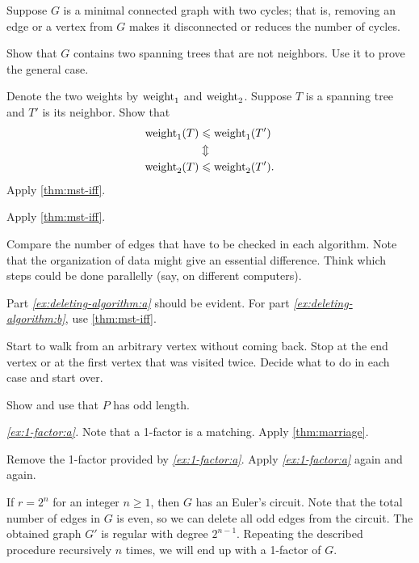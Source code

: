 Suppose $G$ is a minimal connected graph with two cycles;
that is, removing an edge or a vertex from $G$ makes it disconnected or reduces the number of cycles.

Show that $G$ contains two spanning trees that are not neighbors.
Use it to prove the general case.

 Denote the two weights by $\mathop{\rm weight}\nolimits_1$ and $\mathop{\rm weight}\nolimits_2$.
Suppose $T$ is a spanning tree and $T'$ is its neighbor. 
Show that 
\begin{align*}
\mathop{\rm weight}\nolimits_1(T)&\leqslant \mathop{\rm weight}\nolimits_1(T')
\\
&\Updownarrow
\\
\mathop{\rm weight}\nolimits_2(T)&\leqslant \mathop{\rm weight}\nolimits_2(T').
\end{align*}
Apply \ref{thm:mst-iff}.

 Apply \ref{thm:mst-iff}.

Compare the number of edges that have to be checked in each algorithm.
Note that the organization of data might give an essential difference.
Think which steps could be done parallelly (say, on different computers).


Part \textit{\ref{ex:deleting-algorithm:a}} should be evident.
For part \textit{\ref{ex:deleting-algorithm:b}}, use \ref{thm:mst-iff}.

Start to walk from an arbitrary vertex without coming back.
Stop at the end vertex or at the first vertex that was visited twice.
Decide what to do in each case and start over.

\setcounter{eqtn}{0}

 Show and use that $P$ has odd length.

\parbf{\ref{ex:1-factor};} \textit{\ref{ex:1-factor:a}.}
Note that a 1-factor is a matching.
Apply \ref{thm:marriage}.

Remove the 1-factor provided by \textit{\ref{ex:1-factor:a}}. Apply \textit{\ref{ex:1-factor:a}} again and again.

If $r=2^n$ for an integer $n\ge 1$, then $G$ has an Euler's circuit. 
Note that the total number of edges in $G$ is even, so we can delete all odd edges from the circuit.
The obtained graph $G'$ is regular with degree $2^{n-1}$.
Repeating the described procedure recursively $n$ times, 
we will end up with a 1-factor of $G$.

